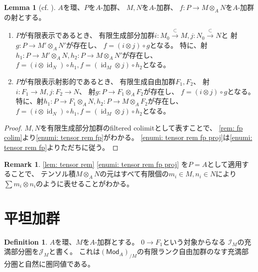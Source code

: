 \documentclass[uplatex]{jsarticle}
\theoremstyle{definition}
\newtheorem{lem}[lem]{Lemma}
\newtheorem{defi}[defi]{Definition}
\newtheorem{rem}[rem]{Remark}
\theoremstyle{plain}
\DeclareMathOperator{\id}{\mathrm{id}}
\newcommand{\Mod}{\mathsf{Mod}}
\newcommand{\mcI}{\mathcal{I}}
\newcommand{\mcJ}{\mathcal{J}}
\begin{document}
\begin{lem}[{cf. \cite[1.106]{GW}}]\label{lem: tensor rem}
  \(A\)を環、\(P\)を\(A\)-加群、
  \(M,N\)を\(A\)-加群、
  \(f:P\to M\otimes_AN\)を\(A\)-加群の射とする。
  \begin{enumerate}
    \item \label{enumi: tensor rem fp}
    \(P\)が有限表示であるとき、
    有限生成部分加群\(i:M_0\xrightarrow{\subset} M,j:N_0\xrightarrow{\subset} N\)と
    射\(g:P\to M'\otimes_AN'\)が存在し、
    \(f = (i\otimes j)\circ g\)となる。
    特に、射\(h_1:P\to M'\otimes_AN, h_2:P\to M\otimes_AN'\)が存在し、
    \(f = (i\otimes \id_N)\circ h_1, f = (\id_M\otimes j)\circ h_2\)となる。
    \item \label{enumi: tensor rem fp proj}
    \(P\)が有限表示射影的であるとき、
    有限生成自由加群\(F_1,F_2\)、
    射\(i:F_1\to M, j:F_2\to N\)、
    射\(g:P\to F_1\otimes_AF_2\)が存在し、
    \(f = (i\otimes j)\circ g\)となる。
    特に、射\(h_1:P\to F_1\otimes_AN, h_2:P\to M\otimes_AF_2\)が存在し、
    \(f = (i\otimes \id_N)\circ h_1, f = (\id_M\otimes j)\circ h_2\)となる。
  \end{enumerate}
\end{lem}

\begin{proof}
  \(M,N\)を有限生成部分加群のfiltered colimitとして表すことで、
  \autoref{rem: fp colim}より\ref{enumi: tensor rem fp}がわかる。
  \ref{enumi: tensor rem fp proj}は\ref{enumi: tensor rem fp}よりただちに従う。
\end{proof}


\begin{rem}
  \autoref{lem: tensor rem} \ref{enumi: tensor rem fp proj}
  を\(P=A\)として適用することで、
  テンソル積\(M\otimes_AN\)の元はすべて有限個の\(m_i\in M, n_i\in N\)により
  \(\sum m_i\otimes n_i\)のように表せることがわかる。
\end{rem}










\section{平坦加群}



\begin{defi}
  \(A\)を環、\(M\)を\(A\)-加群とする。
  \(0\to F_1\)という対象からなる
  \(\mcI_M\)の充満部分圏を\(\mcJ_M\)と書く。
  これは\((\Mod_A)_{/M}\)の有限ランク自由加群のなす充満部分圏と自然に圏同値である。
\end{defi}
\end{document}
